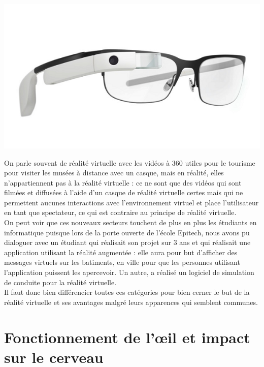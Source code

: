\documentclass[12pt, a4paper]{report}
\begin{document}
\begin{center}
\includegraphics[scale=0.3]{glass.png}
\end{center}
On parle souvent de réalité virtuelle avec les vidéos à 360\degres{} utiles pour le tourisme pour visiter les musées à distance avec un casque, mais en réalité, elles n'appartiennent pas à la réalité virtuelle : ce ne sont que des vidéos qui sont filmées et diffusées à l'aide d'un casque de réalité virtuelle certes mais qui ne permettent aucunes interactions avec l'environnement virtuel et place l'utilisateur en tant que spectateur, ce qui est contraire au principe de réalité virtuelle.\\

On peut voir que ces nouveaux secteurs touchent de plus en plus les étudiants en informatique puisque lors de la porte ouverte de l'école Epitech, nous avons pu dialoguer avec un étudiant qui réalisait son projet sur 3 ans et qui réalisait une application utilisant la réalité augmentée : elle aura pour but d'afficher des messages virtuels sur les batiments, en ville pour que les personnes utilisant l'application puissent les apercevoir. Un autre, a réalisé un logiciel de simulation de conduite pour la réalité virtuelle.\\

Il faut donc bien différencier toutes ces catégories pour bien cerner le but de la réalité virtuelle et ses avantages malgré leurs apparences qui semblent communes.

\chapter[l'\oe il et le cerveau]{Fonctionnement de l'\oe il et impact sur le cerveau}
\end{document}
